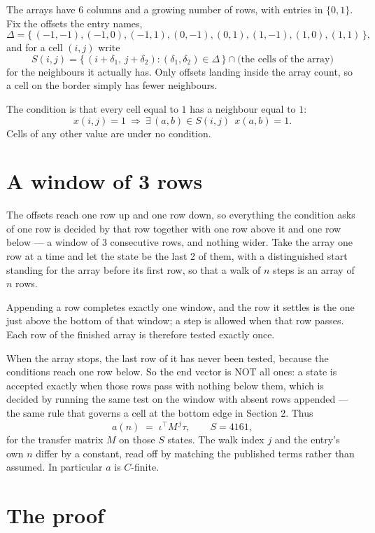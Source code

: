 \documentclass[11pt,a4paper]{article}
\theoremstyle{plain}
\theoremstyle{definition}
\begin{document}
The arrays have $6$ columns and a growing number of rows, with entries in $\{0,1\}$. Fix the
offsets the entry names,
\[
\Delta=\{\,(-1,-1), (-1,0), (-1,1), (0,-1), (0,1), (1,-1), (1,0), (1,1)\,\},
\]
and for a cell $(i,j)$ write
\[
S(i,j)=\{\,(i+\delta_1,\,j+\delta_2) : (\delta_1,\delta_2)\in\Delta\,\}\cap
\text{(the cells of the array)}
\]
for the neighbours it actually has. Only offsets landing inside the array count, so a cell on
the border simply has fewer neighbours.

The condition is that every cell equal to $1$ has a neighbour equal to $1$:
\[
x(i,j)=1\ \Longrightarrow\ \exists\,(a,b)\in S(i,j)\ \ x(a,b)=1 .
\]
Cells of any other value are under no condition.

\section{A window of 3 rows}

The offsets reach one row up and one row down, so everything the condition asks of one row is
decided by that row together with one row above it and one row below --- a window of
$3$ consecutive rows, and nothing wider. Take the array one row at a time and
let the state be the last 2 of them, with a distinguished start standing for the array before its
first row, so that a walk of $n$ steps is an array of $n$ rows.

Appending a row completes exactly one window, and the row it settles is the one just above the bottom of that window; a step is
allowed when that row passes. Each row of the finished array is therefore tested exactly once.

When the array stops, the last row of it has never been tested, because the
conditions reach one row below. So the end vector is NOT all ones: a state is accepted exactly when
those rows pass with nothing below them, which is decided by running the same test on the window
with absent rows appended --- the same rule that governs a cell at the bottom edge in
Section 2.
Thus
\[
a(n)\;=\;\iota^{\!\top}M^{\,j}\tau ,\qquad S=4161,
\]
for the transfer matrix $M$ on those $S$ states. The walk index $j$ and the entry's own $n$
differ by a constant, read off by matching the published terms rather than assumed. In
particular $a$ is $C$-finite.

\section{The proof}
\end{document}
